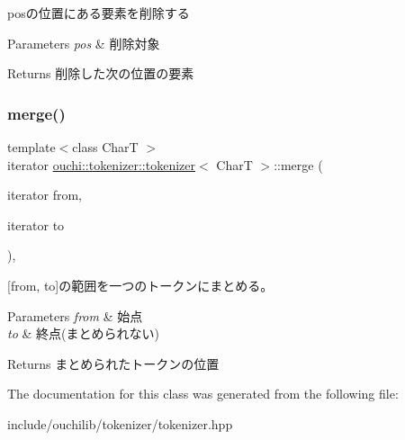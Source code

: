 posの位置にある要素を削除する 


\begin{DoxyParams}{Parameters}
{\em pos} & 削除対象\\
\hline
\end{DoxyParams}
\begin{DoxyReturn}{Returns}
削除した次の位置の要素
\end{DoxyReturn}
\mbox{\label{classouchi_1_1tokenizer_1_1tokenizer_a7ea0961e45bc0c083dd9b0c19c9232f0}} 
\subsubsection{\texorpdfstring{merge()}{merge()}}
{\footnotesize\ttfamily template$<$class CharT $>$ \\
iterator \mbox{\hyperlink{classouchi_1_1tokenizer_1_1tokenizer}{ouchi\+::tokenizer\+::tokenizer}}$<$ CharT $>$\+::merge (\begin{DoxyParamCaption}\item[{iterator}]{from,  }\item[{iterator}]{to }\end{DoxyParamCaption})\hspace{0.3cm}{\ttfamily [inline]}, {\ttfamily [noexcept]}}



\mbox{[}from, to\mbox{]}の範囲を一つのトークンにまとめる。 


\begin{DoxyParams}{Parameters}
{\em from} & 始点\\
\hline
{\em to} & 終点(まとめられない)\\
\hline
\end{DoxyParams}
\begin{DoxyReturn}{Returns}
まとめられたトークンの位置
\end{DoxyReturn}


The documentation for this class was generated from the following file\+:\begin{DoxyCompactItemize}
\item 
include/ouchilib/tokenizer/tokenizer.\+hpp\end{DoxyCompactItemize}
